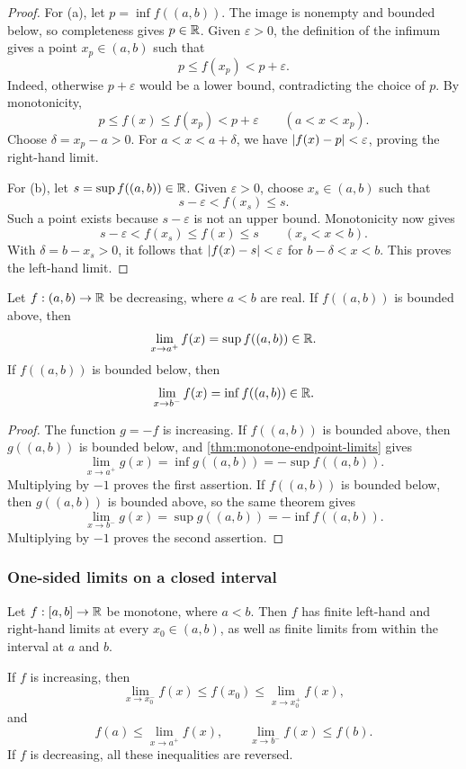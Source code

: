 \documentclass[11pt,a4paper]{amsart}
\begin{document}
\begin{proof}
  For (a), let \(p=\inf f((a,b))\). The image is nonempty and
  bounded below, so completeness gives \(p\in\mathbb{R}\). Given
  \(\varepsilon>0\), the definition of the infimum gives a point
  \(x_p\in(a,b)\) such that
  \[
    p\leq f(x_p)<p+\varepsilon.
  \]
  Indeed, otherwise \(p+\varepsilon\) would be a lower bound,
  contradicting the choice of \(p\). By monotonicity,
  \[
    p\leq f(x)\leq f(x_p)<p+\varepsilon
    \qquad(a<x<x_p).
  \]
  Choose \(\delta=x_p-a>0\). For \(a<x<a+\delta\), we have
  \(\lvert f(x)-p\rvert<\varepsilon\), proving the right-hand limit.

  For (b), let \(s=\sup f((a,b))\in\mathbb{R}\). Given
  \(\varepsilon>0\), choose \(x_s\in(a,b)\) such that
  \[
    s-\varepsilon<f(x_s)\leq s.
  \]
  Such a point exists because \(s-\varepsilon\) is not an upper
  bound. Monotonicity now gives
  \[
    s-\varepsilon<f(x_s)\leq f(x)\leq s
    \qquad(x_s<x<b).
  \]
  With \(\delta=b-x_s>0\), it follows that
  \(\lvert f(x)-s\rvert<\varepsilon\) for \(b-\delta<x<b\).
  This proves the left-hand limit.
\end{proof}

\begin{corollary}\label{cor:decreasing-endpoint-limits}
  Let \(f:(a,b)\to\mathbb{R}\) be decreasing, where \(a<b\) are real.
  If \(f((a,b))\) is bounded above, then
  \[
    \lim_{x\to a^+}f(x)=\sup f((a,b))\in\mathbb{R}.
  \]
  If \(f((a,b))\) is bounded below, then
  \[
    \lim_{x\to b^-}f(x)=\inf f((a,b))\in\mathbb{R}.
  \]
\end{corollary}

\begin{proof}
  The function \(g=-f\) is increasing. If \(f((a,b))\) is
  bounded above, then \(g((a,b))\) is bounded below, and
  \cref{thm:monotone-endpoint-limits} gives
  \[
    \lim_{x\to a^+}g(x)=\inf g((a,b))=-\sup f((a,b)).
  \]
  Multiplying by \(-1\) proves the first assertion. If
  \(f((a,b))\) is bounded below, then \(g((a,b))\) is bounded
  above, so the same theorem gives
  \[
    \lim_{x\to b^-}g(x)=\sup g((a,b))=-\inf f((a,b)).
  \]
  Multiplying by \(-1\) proves the second assertion.
\end{proof}

\subsubsection{One-sided limits on a closed interval}

\begin{theorem}\label{thm:monotone-one-sided-limits}
  Let \(f:[a,b]\to\mathbb{R}\) be monotone, where \(a<b\). Then
  \(f\) has finite left-hand and right-hand limits at every
  \(x_0\in(a,b)\), as well as finite limits from within the
  interval at \(a\) and \(b\).

  If \(f\) is increasing, then
  \[
    \lim_{x\to x_0^-}f(x)\leq f(x_0)
    \leq\lim_{x\to x_0^+}f(x),
  \]
  and
  \[
    f(a)\leq\lim_{x\to a^+}f(x),
    \qquad \lim_{x\to b^-}f(x)\leq f(b).
  \]
  If \(f\) is decreasing, all these inequalities are reversed.
\end{theorem}
\end{document}
